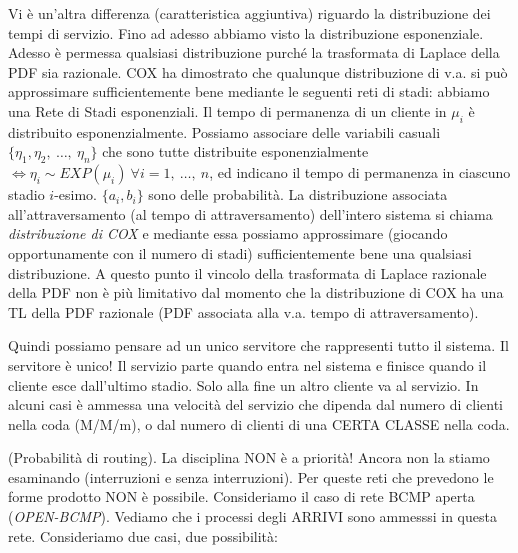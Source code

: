 Vi è un'altra differenza (caratteristica aggiuntiva) riguardo la distribuzione dei tempi di servizio. Fino ad adesso abbiamo visto la distribuzione esponenziale. Adesso è permessa qualsiasi distribuzione purché la trasformata di Laplace della PDF sia razionale. COX ha dimostrato che qualunque distribuzione di v.a. si può approssimare sufficientemente bene mediante le seguenti reti di stadi: abbiamo una Rete di Stadi esponenziali. Il tempo di permanenza di un cliente in $\mu_i$ è distribuito esponenzialmente. Possiamo associare delle variabili casuali $\{\eta_1,\eta_2,\ \dots,\ \eta_n\}$ che sono tutte distribuite esponenzialmente $\iff \eta_i \sim EXP(\mu_i)\ \forall i=1,\ \dots,\ n$, ed indicano il tempo di permanenza in ciascuno stadio $i$-esimo. $\{a_i,b_i\}$ sono delle probabilità. La distribuzione associata all'attraversamento (al tempo di attraversamento) dell'intero sistema si chiama \textit{distribuzione di COX} e mediante essa possiamo approssimare (giocando opportunamente con il numero di stadi) sufficientemente bene una qualsiasi distribuzione. A questo punto il vincolo della trasformata di Laplace razionale della PDF non è più limitativo dal momento che la distribuzione di COX ha una TL della PDF razionale (PDF associata alla v.a. tempo di attraversamento).

Quindi possiamo pensare ad un unico servitore che rappresenti tutto il sistema. Il servitore è unico! Il servizio parte quando entra nel sistema e finisce quando il cliente esce dall'ultimo stadio. Solo alla fine un altro cliente va al servizio. In alcuni casi è ammessa una velocità del servizio che dipenda dal numero di clienti nella coda (M/M/m), o dal numero di clienti di una CERTA CLASSE nella coda.

(Probabilità di routing). La disciplina NON è a priorità! Ancora non la stiamo esaminando (interruzioni e senza interruzioni). Per queste reti che prevedono le forme prodotto NON è possibile.
Consideriamo il caso di rete BCMP aperta (\textit{OPEN-BCMP}). Vediamo che i processi degli ARRIVI sono ammesssi in questa rete. Consideriamo due casi, due possibilità:

